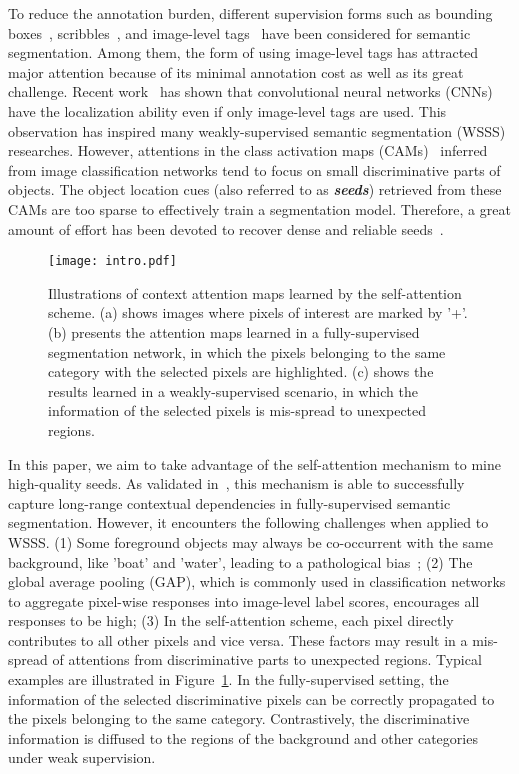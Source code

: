 \documentclass[journal]{IEEEtran}
\begin{document}
To reduce the annotation burden, different supervision forms such as bounding boxes~\cite{Xu2015weak}, scribbles~\cite{lin2016scribble}, and image-level tags~\cite{kolesnikov2016seed} have been considered for semantic segmentation. Among them, the form of using image-level tags has attracted major attention because of its minimal annotation cost as well as its great challenge. Recent work~\cite{zhou2016learning} has shown that convolutional neural networks (CNNs) have the localization ability even if only image-level tags are used. This observation has inspired many weakly-supervised semantic segmentation (WSSS) researches. However, attentions in the class activation maps (CAMs)~\cite{zhou2016learning} inferred from image classification networks tend to focus on small discriminative parts of objects. The object location cues (also referred to as \textit{\textbf{seeds}}) retrieved from these CAMs are too sparse to effectively train a segmentation model. Therefore, a great amount of effort has been devoted to recover dense and reliable seeds~\cite{wei2017object,huang2018weakly,wei2018revisiting,lee2019ficklenet,Jing2019dilated}. 

\begin{figure}[t]
	\centering
	\texttt{[image: intro.pdf]}
	\caption{Illustrations of context attention maps learned by the self-attention scheme. (a) shows images where pixels of interest are marked by '+'. (b) presents the attention maps learned in a fully-supervised segmentation network, in which the pixels belonging to the same category with the selected pixels are highlighted. (c) shows the results learned in a weakly-supervised scenario, in which the information of the selected pixels is mis-spread to unexpected regions.}
	\label{fig:self-attention}
\end{figure}

In this paper, we aim to take advantage of the self-attention mechanism to mine high-quality seeds. As validated in~\cite{fu2019dual,yuan2018ocnet}, this mechanism is able to successfully capture long-range contextual dependencies in fully-supervised semantic segmentation. However, it encounters the following challenges when applied to WSSS. (1) Some foreground objects may always be co-occurrent with the same background, like 'boat' and 'water', leading to a pathological bias~\cite{li2018tell}; (2) The global average pooling (GAP), which is commonly used in classification networks to aggregate pixel-wise responses into image-level label scores, encourages all responses to be high; (3) In the self-attention scheme, each pixel directly contributes to all other pixels and vice versa. These factors may result in a mis-spread of attentions from discriminative parts to unexpected regions. Typical examples are illustrated in Figure~\ref{fig:self-attention}. In the fully-supervised setting, the information of the selected discriminative pixels can be correctly propagated to the pixels belonging to the same category. Contrastively, the discriminative information is diffused to the regions of the background and other categories under weak supervision. 
\end{document}
